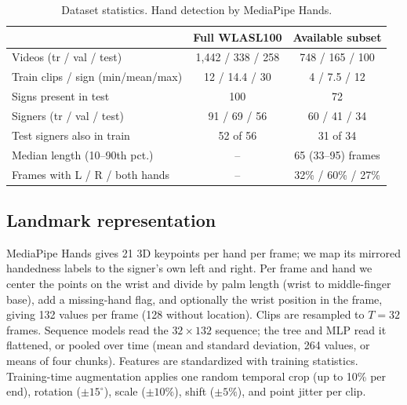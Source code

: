 \documentclass{article}
\begin{document}
\begin{table}[t]
\centering\footnotesize\setlength{\tabcolsep}{3pt}
\begin{tabular}{lcc}
\toprule
 & Full WLASL100 & Available subset \\
\midrule
Videos (tr / val / test) & 1{,}442 / 338 / 258 & 748 / 165 / 100 \\
Train clips / sign (min/mean/max) & 12 / 14.4 / 30 & 4 / 7.5 / 12 \\
Signs present in test & 100 & 72 \\
Signers (tr / val / test) & 91 / 69 / 56 & 60 / 41 / 34 \\
Test signers also in train & 52 of 56 & 31 of 34 \\
Median length (10--90th pct.) & -- & 65 (33--95) frames \\
Frames with L / R / both hands & -- & 32\% / 60\% / 27\% \\
\bottomrule
\end{tabular}
\caption{Dataset statistics. Hand detection by MediaPipe Hands.}
\label{tab:data}
\end{table}

\subsection{Landmark representation}
MediaPipe Hands \citep{zhang2020mediapipehands} gives 21 3D keypoints per hand per frame; we map its
mirrored handedness labels to the signer's own left and right. Per frame and hand we center the points on
the wrist and divide by palm length (wrist to middle-finger base), add a missing-hand flag, and
optionally the wrist position in the frame, giving 132 values per frame (128 without location). Clips are
resampled to $T{=}32$ frames. Sequence models read the $32\times132$ sequence; the tree and MLP read it
flattened, or pooled over time (mean and standard deviation, 264 values, or means of four chunks).
Features are standardized with training statistics. Training-time augmentation applies one random
temporal crop (up to 10\% per end), rotation ($\pm15^\circ$), scale ($\pm10\%$), shift ($\pm5\%$), and
point jitter per clip.
\end{document}
